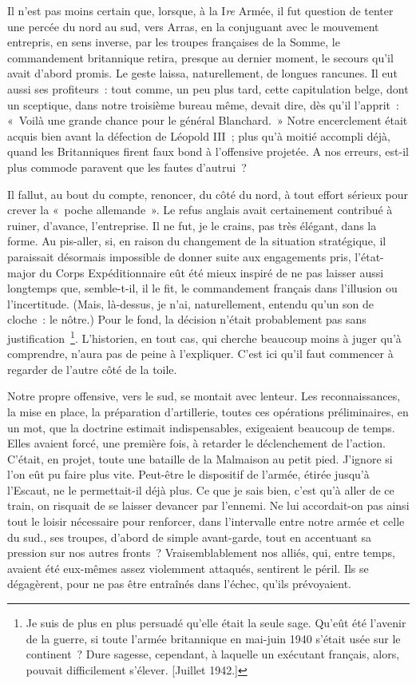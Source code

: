 \documentclass[french,twoside]{book} %
\begin{document}
Il n’est pas moins certain que, lorsque, à la I\emph{re} Armée, il fut question de tenter une percée du nord au sud, vers Arras, en la conjuguant avec le mouvement entrepris, en sens inverse, par les troupes françaises de la Somme, le commandement britannique retira, presque au dernier moment, le secours qu’il avait d’abord promis. Le geste laissa, naturellement, de longues rancunes. Il eut aussi ses profiteurs : tout comme, un peu plus tard, cette capitulation belge, dont un sceptique, dans notre troisième bureau même, devait dire, dès qu’il l’apprit : « Voilà une grande chance pour le général Blanchard. » Notre encerclement était acquis bien avant la défection de Léopold III ; plus qu’à moitié accompli déjà, quand les Britanniques firent faux bond à l’offensive projetée. A nos erreurs, est-il plus commode paravent que les fautes d’autrui ?\par
Il fallut, au bout du compte, renoncer, du côté du nord, à tout effort sérieux pour crever la « poche allemande ». Le refus anglais avait certainement contribué à ruiner, d’avance, l’entreprise. Il ne fut, je le crains, pas très élégant, dans la forme. Au pis-aller, si, en raison du changement de la situation stratégique, il paraissait désormais impossible de donner suite aux engagements pris, l’état-major du Corps Expéditionnaire eût été mieux inspiré de ne pas laisser aussi longtemps que, semble-t-il, il le fit, le commandement français dans l’illusion ou l’incertitude. (Mais, là-dessus, je n’ai, naturellement, entendu qu’un son de cloche : le nôtre.) Pour le fond, la décision n’était probablement pas sans   justification \footnote{Je suis de plus en plus persuadé qu’elle était la seule sage. Qu’eût été l’avenir de la guerre, si toute l’armée britannique en mai-juin 1940 s’était usée sur le continent ? Dure sagesse, cependant, à laquelle un exécutant français, alors, pouvait difficilement s’élever. [Juillet 1942.]}. L’historien, en tout cas, qui cherche beaucoup moins à juger qu’à comprendre, n’aura pas de peine à l’expliquer. C’est ici qu’il faut commencer à regarder de l’autre côté de la toile.\par
Notre propre offensive, vers le sud, se montait avec lenteur. Les reconnaissances, la mise en place, la préparation d’artillerie, toutes ces opérations préliminaires, en un mot, que la doctrine estimait indispensables, exigeaient beaucoup de temps. Elles avaient forcé, une première fois, à retarder le déclenchement de l’action. C’était, en projet, toute une bataille de la Malmaison au petit pied. J’ignore si l’on eût pu faire plus vite. Peut-être le dispositif de l’armée, étirée jusqu’à l’Escaut, ne le permettait-il déjà plus. Ce que je sais bien, c’est qu’à aller de ce train, on risquait de se laisser devancer par l’ennemi. Ne lui accordait-on pas ainsi tout le loisir nécessaire pour renforcer, dans l’intervalle entre notre armée et celle du sud., ses troupes, d’abord de simple avant-garde, tout en accentuant sa pression sur nos autres fronts ? Vraisemblablement nos alliés, qui, entre temps, avaient été eux-mêmes assez violemment attaqués, sentirent le péril. Ils se dégagèrent, pour ne pas être entraînés dans l’échec, qu’ils prévoyaient.\par
\end{document}

